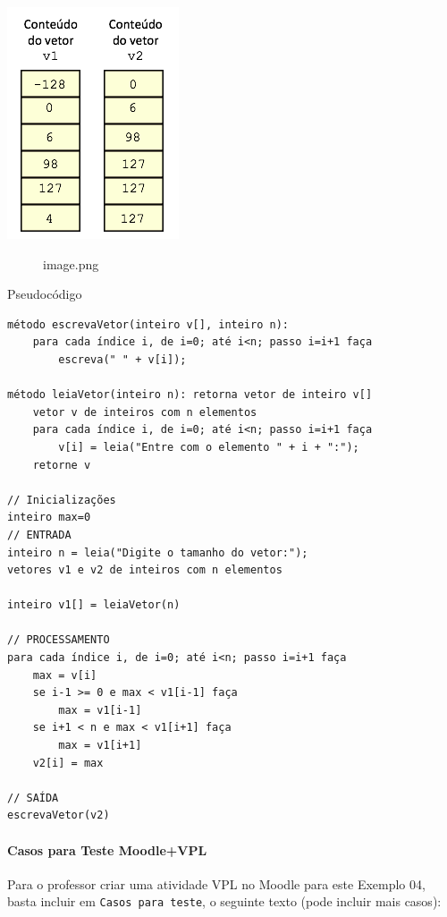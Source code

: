 \documentclass[12pt,a4paper]{article}
\begin{document}
\includegraphics{"figs/image35.png"}

    \begin{figure}
\centering
\caption{image.png}
\end{figure}

    Pseudocódigo

\begin{verbatim}
método escrevaVetor(inteiro v[], inteiro n):
    para cada índice i, de i=0; até i<n; passo i=i+1 faça
        escreva(" " + v[i]);

método leiaVetor(inteiro n): retorna vetor de inteiro v[]
    vetor v de inteiros com n elementos
    para cada índice i, de i=0; até i<n; passo i=i+1 faça
        v[i] = leia("Entre com o elemento " + i + ":");
    retorne v

// Inicializações
inteiro max=0
// ENTRADA
inteiro n = leia("Digite o tamanho do vetor:");
vetores v1 e v2 de inteiros com n elementos

inteiro v1[] = leiaVetor(n)

// PROCESSAMENTO
para cada índice i, de i=0; até i<n; passo i=i+1 faça
    max = v[i]
    se i-1 >= 0 e max < v1[i-1] faça
        max = v1[i-1]
    se i+1 < n e max < v1[i+1] faça
        max = v1[i+1]
    v2[i] = max

// SAÍDA
escrevaVetor(v2)
\end{verbatim}

    \hypertarget{casos-para-teste-moodlevpl}{%
\paragraph{Casos para Teste
Moodle+VPL}\label{casos-para-teste-moodlevpl}}

Para o professor criar uma atividade VPL no Moodle para este Exemplo 04,
basta incluir em \texttt{Casos\ para\ teste}, o seguinte texto (pode
incluir mais casos):
\end{document}
